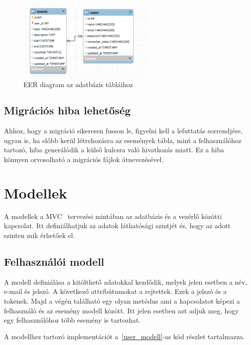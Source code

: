 \documentclass[
]{thesis-ekf}
\theoremstyle{definition}
\theoremstyle{remark}
\begin{document}
	\begin{figure}[ht!]
		\centering
		\includegraphics[width=0.6\textwidth]{database/EER_diagram}
		\caption{EER diagram az adatbázis tábláihoz}
		\label{figure:eer_diagram}
	\end{figure}
	
	\subsection{Migrációs hiba lehetőség}
	Ahhoz, hogy a migráció sikeresen fusson le, figyelni kell a lefuttatás sorrendjére, ugyan is, ha előbb kerül létrehozásra az események tábla, mint a felhasználóhoz tartozó, hiba generálódik a külső kulcsra való hivatkozás miatt. Ez a hiba könnyen orvosolható a migrációs fájlok átnevezésével.
	
	\section{Modellek}
	A modellek a MVC~\cite{mvc_mozzilla} tervezési mintában az adatbázis és a vezérlő közötti kapcsolat. Itt definiálhatjuk az adatok láthatósági szintjét és, hogy az adott szinten mik érhetőek el.
	
	\subsection{Felhasználói modell}
	A modell definiálása a kitölthető adatokkal kezdődik, melyek jelen esetben a név, e-mail és jelszó. A következő attribútumokat a rejtettek. Ezek a jelszó és a tokenek. Majd a végén található egy olyan metódus ami a kapcsolatot képezi a felhasználó és az esemény modell között. Itt jelen esetben azt adjuk meg, hogy egy felhasználóhoz több esemény is tartozhat.
	
	A modellhez tartozó implementációt a~\ref{user_modell}-as kód részlet tartalmazza.
	
	
	
\end{document}
